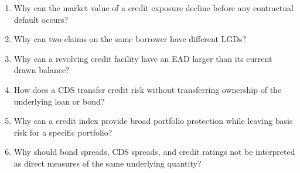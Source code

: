 

\begin{enumerate}

\item Why can the market value of a credit exposure decline before any contractual default occurs?

\item Why can two claims on the same borrower have different LGDs?

\item Why can a revolving credit facility have an EAD larger than its current drawn balance?

\item How does a CDS transfer credit risk without transferring ownership of the underlying loan or bond?

\item Why can a credit index provide broad portfolio protection while leaving basis risk for a specific portfolio?

\item Why should bond spreads, CDS spreads, and credit ratings not be interpreted as direct measures of the same underlying quantity?

\end{enumerate}





